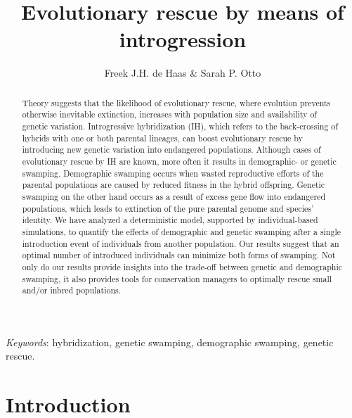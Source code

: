 \documentclass[a4paper,10pt]{article}
\begin{document}
	\title{Evolutionary rescue by means of introgression}
	\author{Freek J.H. de Haas \& Sarah P. Otto }
	\maketitle

	\begin{abstract}
	Theory suggests that the likelihood of evolutionary rescue, where evolution prevents otherwise inevitable extinction, increases with population size and availability of genetic variation. Introgressive hybridization (IH), which refers to the back-crossing of hybrids with one or both parental lineages, can boost evolutionary rescue by introducing new genetic variation into endangered populations. Although cases of evolutionary rescue by IH are known, more often it results in demographic- or genetic swamping. Demographic swamping occurs when wasted reproductive efforts of the parental populations are caused by reduced fitness in the hybrid offspring. Genetic swamping on the other hand occurs as a result of excess gene flow into endangered populations, which leads to extinction of the pure parental genome and species' identity. We have analyzed a deterministic model, supported by individual-based simulations, to quantify the effects of demographic and genetic swamping after a single introduction event of individuals from another population. Our results suggest that an optimal number of introduced individuals can minimize both forms of swamping. Not only do our results provide insights into the trade-off between genetic and demographic swamping, it also provides tools for conservation managers to optimally rescue small and/or inbred populations.
	\end{abstract}
	\textit{Keywords}: hybridization, genetic swamping, demographic swamping, genetic rescue.
	\\
	
	\newpage
	
	\section*{Introduction}
	
	\doublespacing
	\linenumbers
	\modulolinenumbers[2]
	
\end{document}

